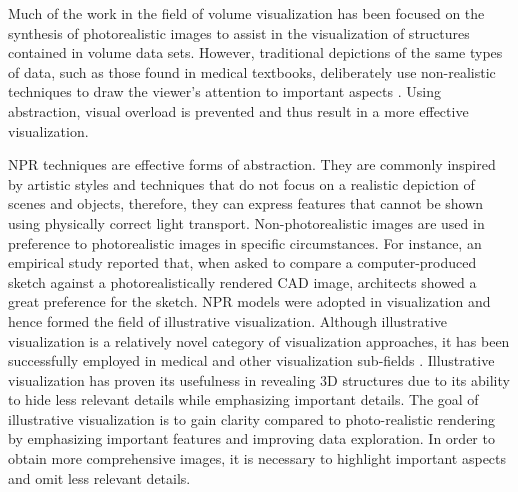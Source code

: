 Much of the work in the field of volume visualization has been focused on the synthesis of photorealistic images to assist in the visualization of structures contained in volume data sets.
However, traditional depictions of the same types of data, such as those found in medical textbooks, deliberately use non-realistic techniques to draw the viewer's attention to important aspects \cite{bruckner_style_2007}. Using abstraction, visual overload is prevented and thus result in a more effective visualization.

NPR techniques are effective forms of abstraction. They are commonly inspired by artistic styles and techniques that do not focus on a realistic depiction of scenes and objects, therefore, they can express features that cannot be shown using physically correct light transport. Non-photorealistic images are used in preference to photorealistic images in specific circumstances. For instance, an empirical study \cite{schumann_assessing_1996} reported that, when asked to compare a computer-produced sketch against a photorealistically rendered CAD image, architects showed a great preference for the sketch.
NPR models were adopted in visualization and hence formed the field of illustrative visualization.
Although illustrative visualization is a relatively novel category of visualization approaches, it has been successfully employed in medical and other visualization sub-fields \cite{svakhine_illustration_2005} \cite{svakhine_illustration-inspired_2009}.
Illustrative visualization has proven its usefulness in revealing 3D structures due to its ability to hide less relevant details while emphasizing important details. The goal of illustrative visualization is to gain clarity compared to photo-realistic rendering by emphasizing important features and improving data exploration. In order to obtain more comprehensive images, it is necessary to highlight important aspects and omit less relevant details.

%

